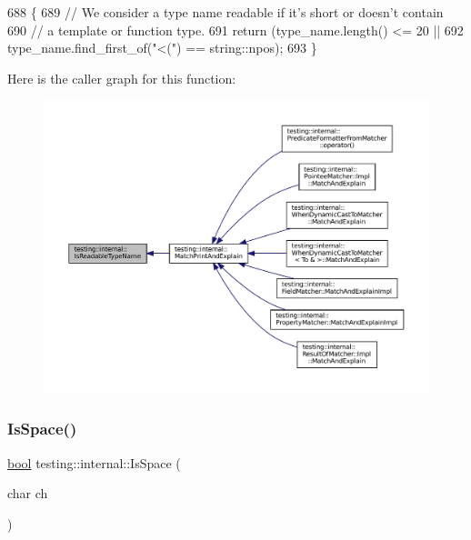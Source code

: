 \begin{DoxyCode}
688                                                         \{
689   \textcolor{comment}{// We consider a type name readable if it's short or doesn't contain}
690   \textcolor{comment}{// a template or function type.}
691   \textcolor{keywordflow}{return} (type\_name.length() <= 20 ||
692           type\_name.find\_first\_of(\textcolor{stringliteral}{"<("}) == string::npos);
693 \}
\end{DoxyCode}
Here is the caller graph for this function\+:
\nopagebreak
\begin{figure}[H]
\begin{center}
\leavevmode
\includegraphics[width=350pt]{namespacetesting_1_1internal_a19a5d50382569ce6ee94e2b68ddc6fc7_icgraph}
\end{center}
\end{figure}
\mbox{\label{namespacetesting_1_1internal_af429e04f70f9c10f6aa76a5d1ccd389f}} 
\subsubsection{\texorpdfstring{Is\+Space()}{IsSpace()}}
{\footnotesize\ttfamily \hyperlink{classbool}{bool} testing\+::internal\+::\+Is\+Space (\begin{DoxyParamCaption}\item[{char}]{ch }\end{DoxyParamCaption})\hspace{0.3cm}{\ttfamily [inline]}}



